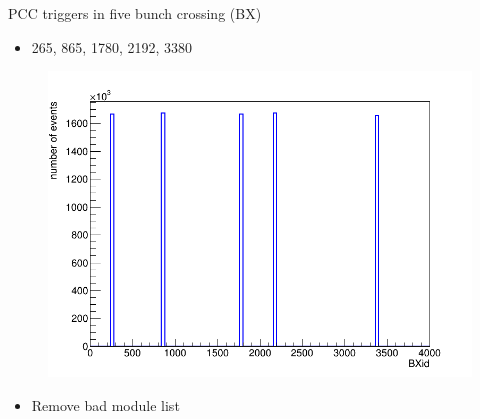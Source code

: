 \documentclass{beamer}
\begin{document}
	\begin{frame}
		\begin{block}{PCC triggers in five bunch crossing (BX)}
			\begin{itemize}[label=$\triangleright$]
				\item 265, 865, 1780, 2192, 3380
			\end{itemize}
			\begin{figure}[H!]
				\begin{center}
					\includegraphics[scale=0.22]{BXid(1530412500<timeStamp<1530412800).png}
				\end{center}
			\end{figure}
			\begin{itemize}[label=$\triangleright$]
				\item Remove bad module list
			\end{itemize}
		\end{block}
	\end{frame}
\end{document}
